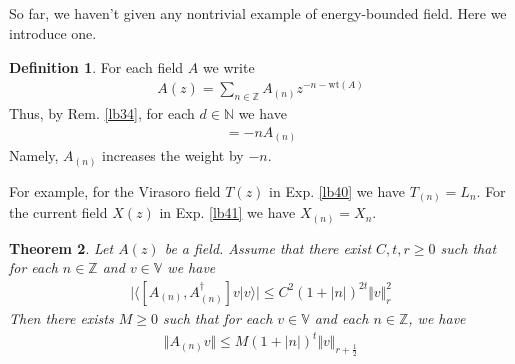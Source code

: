 \documentclass[12pt,b5paper,notitlepage]{article}
\theoremstyle{definition}
\newtheorem{df}{Definition}[section]
\theoremstyle{plain}
\newtheorem{thm}[df]{Theorem}
\newcommand{\bk}[1]{\langle {#1}\rangle}
\newcommand{\Vbb}{\mathbb V}
\newcommand{\Nbb}{\mathbb N}
\newcommand{\Zbb}{\mathbb Z}
\newcommand{\wt}{\mathrm{wt}}
\numberwithin{equation}{section}
\begin{document}
\subsection{}


So far, we haven't given any nontrivial example of energy-bounded field. Here we introduce one. 

\begin{df}
For each field $A$ we write 
\begin{align}
A(z)=\sum_{n\in\Zbb} A_{(n)}z^{-n-\wt(A)}
\end{align}
Thus, by Rem. \ref{lb34}, for each $d\in\Nbb$ we have
\begin{align}
[L_0,A_{(n)}]=-nA_{(n)}
\end{align}
Namely, $A_{(n)}$ increases the weight by $-n$.
\end{df}

For example, for the Virasoro field $T(z)$ in Exp. \ref{lb40} we have $T_{(n)}=L_n$. For the current field $X(z)$ in Exp. \ref{lb41} we have $X_{(n)}=X_n$.

\begin{thm}\label{lb42}
Let $A(z)$ be a field. Assume that there exist $C,t,r\geq0$ such that for each $n\in\Zbb$ and $v\in\Vbb$ we have
\begin{align}\label{eq66}
\big|\bk{[A_{(n)},A_{(n)}^\dagger]v|v}\big|\leq C^2(1+|n|)^{2t}\Vert v\Vert_r^2
\end{align}
Then there exists $M\geq0$ such that for each $v\in\Vbb$ and each  $n\in\Zbb$, we have
\begin{align}\label{eq65}
\Vert A_{(n)}v\Vert \leq M(1+|n|)^t\Vert v\Vert_{r+\frac 12}
\end{align}
\end{thm}
\end{document}
